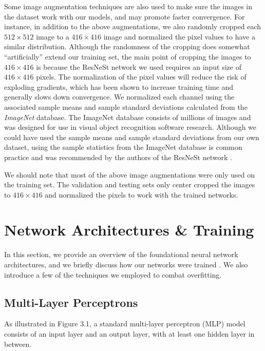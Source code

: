 \documentclass [MAS] {uclathes}
\begin{document}
Some image augmentation techniques are also used to make sure the images in the dataset work with our models, and may promote faster convergence. For instance, in addition to the above augmentations, we also randomly cropped each $512 \times 512$ image to a $416 \times 416$ image and normalized the pixel values to have a similar distribution. Although the randomness of the cropping does somewhat ``artificially'' extend our training set, the main point of cropping the images to $416 \times 416$ is because the ResNeSt network we used requires an input size of $416 \times 416$ pixels. The normalization of the pixel values will reduce the risk of exploding gradients, which has been shown to increase training time and generally slows down convergence. We normalized each channel using the associated sample means and sample standard deviations calculated from the \textit{ImageNet} database. The ImageNet database consists of millions of images and was designed for use in visual object recognition software research. Although we could have used the sample means and sample standard deviations from our own dataset, using the sample statistics from the ImageNet database is common practice and was recommended by the authors of the ResNeSt network \cite{pt_resnest}.

We should note that most of the above image augmentations were only used on the training set. The validation and testing sets only center cropped the images to $416 \times 416$ and normalized the pixels to work with the trained networks.

\section{Network Architectures \& Training}

In this section, we provide an overview of the foundational neural network architectures, and we briefly discuss how our networks were trained \cite{MLnote}. We also introduce a few of the techniques we employed to combat overfitting.

\subsection{Multi-Layer Perceptrons}

As illustrated in Figure 3.1, a standard multi-layer perceptron (MLP) model consists of an input layer and an output layer, with at least one hidden layer in between. 
\end{document}
